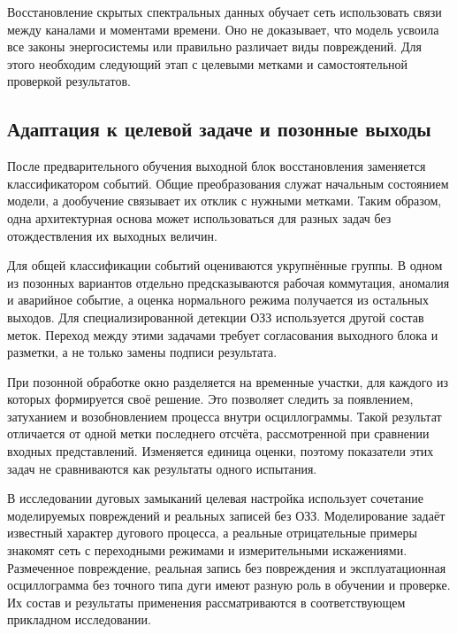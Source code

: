 Восстановление скрытых спектральных данных обучает сеть
использовать связи между каналами и моментами времени.
Оно не доказывает, что модель усвоила все законы
энергосистемы или правильно различает виды повреждений.
Для этого необходим следующий этап с целевыми метками
и самостоятельной проверкой результатов.

\subsection{Адаптация к целевой задаче и позонные выходы}
\label{sec:ch4_task_adaptation}


После предварительного обучения выходной блок восстановления
заменяется классификатором событий.
Общие преобразования служат начальным состоянием модели,
а дообучение связывает их отклик с нужными метками.
Таким образом, одна архитектурная основа может использоваться
для разных задач без отождествления их выходных величин.

Для общей классификации событий оцениваются укрупнённые группы.
В одном из позонных вариантов отдельно предсказываются
рабочая коммутация, аномалия и аварийное событие,
а оценка нормального режима получается из остальных выходов.
Для специализированной детекции ОЗЗ используется другой
состав меток. Переход между этими задачами требует
согласования выходного блока и разметки,
а не только замены подписи результата.

При позонной обработке окно разделяется на временные участки,
для каждого из которых формируется своё решение.
Это позволяет следить за появлением, затуханием
и возобновлением процесса внутри осциллограммы.
Такой результат отличается от одной метки последнего
отсчёта, рассмотренной при сравнении входных представлений.
Изменяется единица оценки, поэтому показатели этих задач
не сравниваются как результаты одного испытания.

В исследовании дуговых замыканий целевая настройка
использует сочетание моделируемых повреждений
и реальных записей без ОЗЗ.
Моделирование задаёт известный характер дугового процесса,
а реальные отрицательные примеры знакомят сеть
с переходными режимами и измерительными искажениями.
Размеченное повреждение, реальная запись без повреждения
и эксплуатационная осциллограмма без точного типа дуги
имеют разную роль в обучении и проверке.
Их состав и результаты применения рассматриваются
в соответствующем прикладном исследовании.

